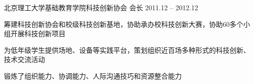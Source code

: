 


\begin{cventries}


\ljyhuodong
{} %
{北京理工大学基础教育学院科技创新协会} %
{会长} %
{2011.12 -- 2012.12} %
{ %
\begin{cvitems}
\item {筹建科技创新协会和校级科技创新基地，协助承办校科技创新大赛，协助60多个小组开展科技创新项目}
\item {为低年级学生提供场地、设备等实践平台，策划组织近百场多种形式的科技创新、技术交流活动}
\item {锻炼了组织能力、协调能力、人际沟通技巧和资源整合能力}
\end{cvitems}
}


\end{cventries}


